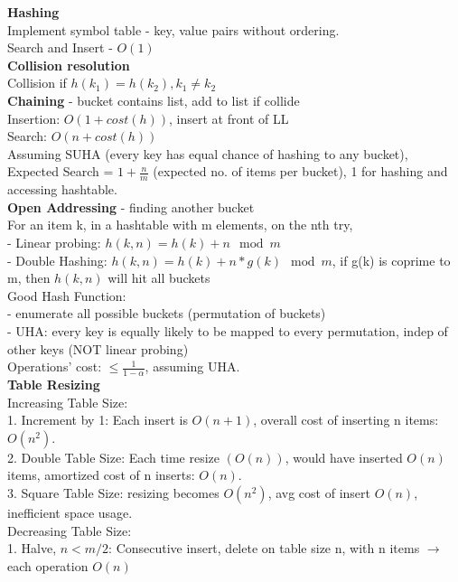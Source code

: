 \documentclass[10pt, a4paper]{article}
\begin{document}
\begin{multicols*}{3}
		{\normalsize\textbf{Hashing}}\\
		Implement symbol table - key, value pairs without ordering.\\
		Search and Insert - $O(1)$\\
		\textbf{Collision resolution}\\
		Collision if $h(k_1) = h(k_2), k_1 \neq k_2$\\ 
		\textbf{Chaining} - bucket contains list, add to list if collide\\
		Insertion: $O(1 + cost(h))$, insert at front of LL\\
		Search: $O(n + cost(h))$\\
		Assuming SUHA (every key has equal chance of hashing to any bucket), \\
		Expected Search = $1 + \frac{n}{m}$ (expected no. of items per bucket), 1 for hashing and accessing hashtable.\\
		\textbf{Open Addressing} - finding another bucket\\
		For an item k, in a hashtable with m elements, on the nth try,\\
		- Linear probing: $h(k, n) = h(k) + n \mod m$\\
		- Double Hashing: $h(k, n) = h(k) + n*g(k) \mod m$, if g(k) is coprime to m, then $h(k, n)$ will hit all buckets\\ 
		Good Hash Function:\\ 
		- enumerate all possible buckets (permutation of buckets)\\
		- UHA: every key is equally likely to be mapped to every permutation, indep of other keys (NOT linear probing)\\
		Operations' cost: $\leq \frac{1}{1 - \alpha}$, assuming UHA.\\
		\textbf{Table Resizing}\\
		Increasing Table Size:\\
		1. Increment by 1: Each insert is $O(n + 1)$, overall cost of inserting n items: $O(n^2)$.\\
		2. Double Table Size: Each time resize $(O(n))$, would have inserted $O(n)$ items, amortized cost of n inserts: $O(n)$.\\
		3. Square Table Size: resizing becomes $O(n^2)$, avg cost of insert $O(n)$, inefficient space usage.\\
		Decreasing Table Size:\\
		1. Halve, $n < m/2$: Consecutive insert, delete on table size n, with n items $\rightarrow$ each operation $O(n)$\\

\end{multicols*}
\end{document}

